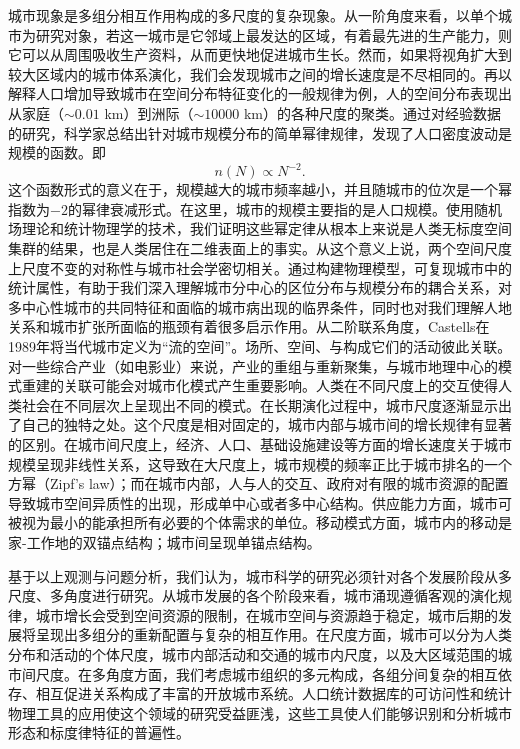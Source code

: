 城市现象是多组分相互作用构成的多尺度的复杂现象。从一阶角度来看，以单个城市为研究对象，若这一城市是它邻域上最发达的区域，有着最先进的生产能力，则它可以从周围吸收生产资料，从而更快地促进城市生长\cite{Arbesman2009}。然而，如果将视角扩大到较大区域内的城市体系演化，我们会发现城市之间的增长速度是不尽相同的\cite{BerryThe}。再以解释人口增加导致城市在空间分布特征变化的一般规律为例，人的空间分布表现出从家庭（$\sim 0.01$ km）到洲际（$\sim 10000$ km）的各种尺度的聚类。通过对经验数据的研究，科学家总结出针对城市规模分布的简单幂律规律，发现了人口密度波动是规模的函数。即\[n(N) \propto N^{−2}.\]这个函数形式的意义在于，规模越大的城市频率越小，并且随城市的位次是一个幂指数为$-2$的幂律衰减形式。在这里，城市的规模主要指的是人口规模。使用随机场理论和统计物理学的技术，我们证明这些幂定律从根本上来说是人类无标度空间集群的结果，也是人类居住在二维表面上的事实。从这个意义上说，两个空间尺度上尺度不变的对称性与城市社会学密切相关。通过构建物理模型，可复现城市中的统计属性，有助于我们深入理解城市分中心的区位分布与规模分布的耦合关系，对多中心性城市的共同特征和面临的城市病出现的临界条件，同时也对我们理解人地关系和城市扩张所面临的瓶颈有着很多启示作用。从二阶联系角度，Castells在1989年将当代城市定义为“流的空间”\cite{castells1989}。场所、空间、与构成它们的活动彼此关联\cite{BerryThe}。对一些综合产业（如电影业）来说，产业的重组与重新聚集，与城市地理中心的模式重建的关联可能会对城市化模式产生重要影响\cite{doi:10.1068/d040305}。人类在不同尺度上的交互使得人类社会在不同层次上呈现出不同的模式。在长期演化过程中，城市尺度逐渐显示出了自己的独特之处。这个尺度是相对固定的，城市内部与城市间的增长规律有显著的区别。在城市间尺度上，经济、人口、基础设施建设等方面的增长速度关于城市规模呈现非线性关系，这导致在大尺度上，城市规模的频率正比于城市排名的一个方幂（Zipf's law）\cite{zipf1949}；而在城市内部，人与人的交互、政府对有限的城市资源的配置导致城市空间异质性的出现，形成单中心或者多中心结构。供应能力方面，城市可被视为最小的能承担所有必要的个体需求的单位。移动模式方面，城市内的移动是家-工作地的双锚点结构；城市间呈现单锚点结构。

基于以上观测与问题分析，我们认为，城市科学的研究必须针对各个发展阶段从多尺度、多角度进行研究。从城市发展的各个阶段来看，城市涌现遵循客观的演化规律，城市增长会受到空间资源的限制，在城市空间与资源趋于稳定，城市后期的发展将呈现出多组分的重新配置与复杂的相互作用。在尺度方面，城市可以分为人类分布和活动的个体尺度，城市内部活动和交通的城市内尺度，以及大区域范围的城市间尺度。在多角度方面，我们考虑城市组织的多元构成，各组分间复杂的相互依存、相互促进关系构成了丰富的开放城市系统。人口统计数据库的可访问性和统计物理工具的应用使这个领域的研究受益匪浅，这些工具使人们能够识别和分析城市形态和标度律特征的普遍性。

